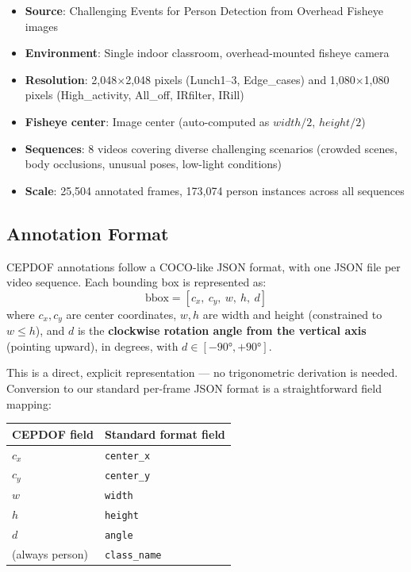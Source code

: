 \documentclass[11pt]{article}
\begin{document}
\begin{itemize}[leftmargin=*]
    \item \textbf{Source}: Challenging Events for Person Detection from Overhead Fisheye images~\cite{cepdof2020}
    \item \textbf{Environment}: Single indoor classroom, overhead-mounted fisheye camera
    \item \textbf{Resolution}: 2,048$\times$2,048 pixels (Lunch1--3, Edge\_cases) and 1,080$\times$1,080 pixels (High\_activity, All\_off, IRfilter, IRill)
    \item \textbf{Fisheye center}: Image center (auto-computed as $width/2$, $height/2$)
    \item \textbf{Sequences}: 8 videos covering diverse challenging scenarios (crowded scenes, body occlusions, unusual poses, low-light conditions)
    \item \textbf{Scale}: 25,504 annotated frames, 173,074 person instances across all sequences
\end{itemize}

\subsection{Annotation Format}

CEPDOF annotations follow a COCO-like JSON format, with one JSON file per video sequence. Each bounding box is represented as:
\begin{equation}
    \text{bbox} = [c_x,\ c_y,\ w,\ h,\ d]
\end{equation}
where $c_x, c_y$ are center coordinates, $w, h$ are width and height (constrained to $w \leq h$), and $d$ is the \textbf{clockwise rotation angle from the vertical axis} (pointing upward), in degrees, with $d \in [-90°, +90°]$.

This is a direct, explicit representation --- no trigonometric derivation is needed. Conversion to our standard per-frame JSON format is a straightforward field mapping:

\begin{center}
\begin{tabular}{ll}
\toprule
\textbf{CEPDOF field} & \textbf{Standard format field} \\
\midrule
$c_x$ & \texttt{center\_x} \\
$c_y$ & \texttt{center\_y} \\
$w$ & \texttt{width} \\
$h$ & \texttt{height} \\
$d$ & \texttt{angle} \\
(always person) & \texttt{class\_name} \\
\bottomrule
\end{tabular}
\end{center}
\end{document}
